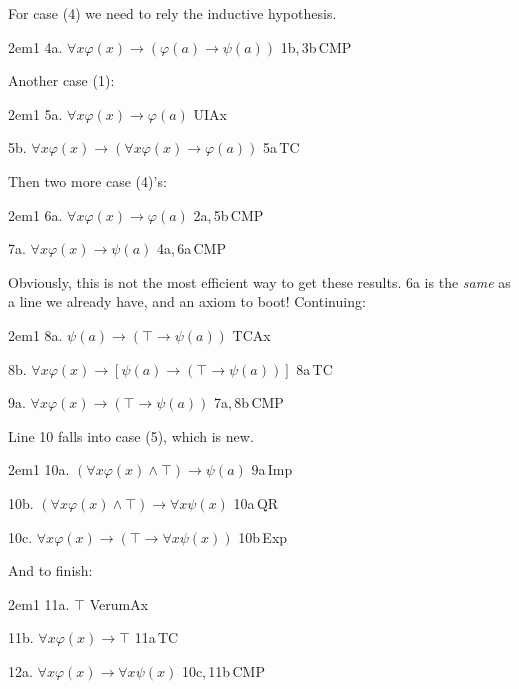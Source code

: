 \documentclass[12pt]{report}
\theoremstyle{nonumberplain}
\newcounter{proofline}
\newenvironment{oproof}{\begin{hangparas}{2em}{1}\setcounter{proofline}{0}}{\end{hangparas}}
\begin{document}
\medskip\noindent For case (4) we need to rely the inductive hypothesis.

\medskip\begin{oproof}
4a.  $∀xφ(x) → (φ(a) → ψ(a))$ \hfill 1b,\,3b\,CMP\par
\end{oproof}

\medskip\noindent Another case (1):

\medskip\begin{oproof}
5a.  $∀xφ(x) → φ(a)$ \hfill UIAx\par
5b.  $∀xφ(x) → (∀xφ(x) → φ(a))$ \hfill 5a\,TC\par
\end{oproof}


\medskip\noindent Then two more case (4)'s:

\medskip\begin{oproof}
6a.  $∀xφ(x) → φ(a)$ \hfill 2a,\,5b\,CMP\par
7a.  $∀xφ(x) → ψ(a)$ \hfill 4a,\,6a\,CMP\par
\end{oproof}

\medskip\noindent Obviously, this is not the most efficient way to get these results. 6a is the \emph{same} as a line we already have, and an axiom to boot! Continuing:

\medskip\begin{oproof}
8a. $ψ(a) → (⊤ → ψ(a))$ \hfill TCAx\par
8b. $∀xφ(x) → [ψ(a) → (⊤ → ψ(a))]$ \hfill 8a\,TC\par
9a. $∀xφ(x) → (⊤ → ψ(a))$ \hfill 7a,\,8b\,CMP\par
\end{oproof}

\medskip\noindent Line 10 falls into case (5), which is new.

\medskip\begin{oproof}
10a. $(∀xφ(x) ∧ ⊤) → ψ(a)$ \hfill 9a\,Imp\par
10b. $(∀xφ(x) ∧ ⊤) → ∀xψ(x)$ \hfill 10a\,QR\par
10c. $∀xφ(x) → (⊤ → ∀xψ(x))$ \hfill 10b\,Exp\par
\end{oproof}

\medskip\noindent And to finish:

\medskip\begin{oproof}
11a. $⊤$ \hfill VerumAx\par
11b. $∀xφ(x) → ⊤$ \hfill 11a\,TC\par
12a. $∀xφ(x) → ∀xψ(x)$ \hfill 10c,\,11b\,CMP
\end{oproof}
\end{document}
